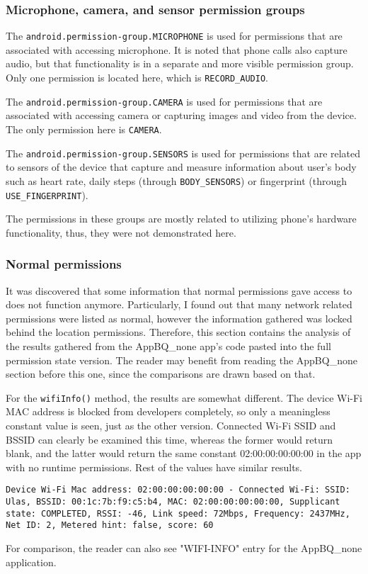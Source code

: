 \documentclass[
  a4paper,  %
  twoside,  %
  bibliography=totoc,
  headsepline,
  cleardoublepage=empty,
  parskip=half,
  draft=false,
  open=any
]{scrbook}
\begin{document}
\subsubsection{Microphone, camera, and sensor permission groups}
The \texttt{android.permission-group.MICROPHONE} is used for permissions that are associated with accessing microphone. It is noted that phone calls also capture audio, but that functionality is in a separate and more visible permission group. Only one permission is located here, which is \texttt{RECORD\_AUDIO}.

The \texttt{android.permission-group.CAMERA} is used for permissions that are associated with accessing camera or capturing images and video from the device. The only permission here is \texttt{CAMERA}.

The \texttt{android.permission-group.SENSORS} is used for permissions that are related to sensors of the device that capture and measure information about user's body such as heart rate, daily steps (through \texttt{BODY\_SENSORS}) or fingerprint (through \texttt{USE\_FINGERPRINT}).

The permissions in these groups are mostly related to utilizing phone's hardware functionality, thus, they were not demonstrated here.

\subsubsection{Normal permissions}
It was discovered that some information that normal permissions gave access to does not function anymore. Particularly, I found out that many network related permissions were listed as normal, however the information gathered was locked behind the location permissions. Therefore, this section contains the analysis of the results gathered from the AppBQ\_none app's code pasted into the full permission state version. The reader may benefit from reading the AppBQ\_none section before this one, since the comparisons are drawn based on that.

For the \texttt{wifiInfo()} method, the results are somewhat different. The device Wi-Fi MAC address is blocked from developers completely, so only a meaningless constant value is seen, just as the other version. Connected Wi-Fi SSID and BSSID can clearly be examined this time, whereas the former would return blank, and the latter would return the same constant 02:00:00:00:00:00 in the app with no runtime permissions. Rest of the values have similar results.
\begin{lstlisting}
Device Wi-Fi Mac address: 02:00:00:00:00:00 - Connected Wi-Fi: SSID: Ulas, BSSID: 00:1c:7b:f9:c5:b4, MAC: 02:00:00:00:00:00, Supplicant state: COMPLETED, RSSI: -46, Link speed: 72Mbps, Frequency: 2437MHz, Net ID: 2, Metered hint: false, score: 60
\end{lstlisting}
For comparison, the reader can also see "WIFI-INFO" entry for the AppBQ\_none application.
\end{document}
